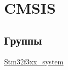 \hypertarget{group___c_m_s_i_s}{
\section{CMSIS}
\label{group___c_m_s_i_s}
}
\subsection*{Группы}
\begin{CompactItemize}
\item 
\hyperlink{group__stm32f3xx__system}{Stm32f3xx\_\-system}
\end{CompactItemize}
